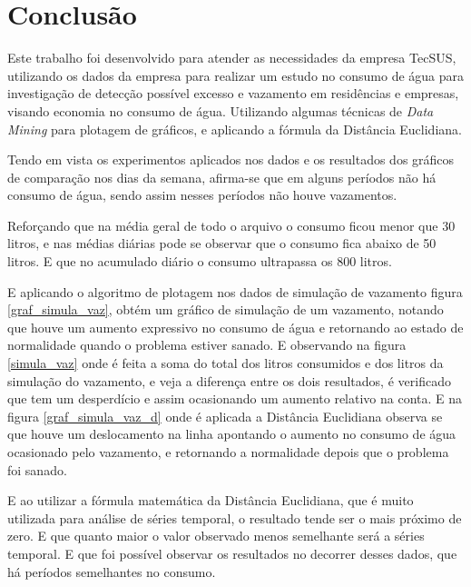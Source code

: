     \newpage
\chapter{Conclusão}
\par Este trabalho foi desenvolvido para atender as necessidades da empresa TecSUS, utilizando os dados da empresa para realizar um estudo no consumo de água para investigação de detecção possível excesso e vazamento em residências e empresas, visando economia no consumo de água. Utilizando  algumas técnicas de \emph{Data Mining} para plotagem de gráficos, e aplicando a fórmula da Distância Euclidiana. 

\par Tendo em vista  os experimentos aplicados nos dados e os resultados dos gráficos de comparação nos dias da semana, afirma-se que  em alguns períodos não há consumo de água, sendo assim nesses períodos  não houve vazamentos.
 
\par Reforçando que na média geral de todo o arquivo o consumo ficou menor que 30 litros, e nas médias diárias pode se observar que o consumo fica abaixo de 50 litros. E que no acumulado diário o consumo ultrapassa os 800 litros.

\par E aplicando o algoritmo de plotagem nos dados de simulação de vazamento figura \ref{graf_simula_vaz}, obtém um gráfico de simulação de um vazamento, notando que houve um aumento expressivo no consumo de água e retornando ao estado de normalidade quando o problema estiver sanado. E observando  na figura \ref{simula_vaz} onde é feita a soma do total dos litros consumidos e dos litros da simulação do vazamento, e veja  a diferença entre os dois resultados, é verificado que tem um desperdício e assim ocasionando um aumento relativo na conta. E na figura \ref{graf_simula_vaz_d} onde é aplicada a Distância Euclidiana observa se que houve um deslocamento na linha apontando o  aumento no consumo de água ocasionado pelo vazamento, e retornando a normalidade depois que o problema foi sanado.

\par E ao utilizar a fórmula matemática da Distância Euclidiana, que é muito utilizada para análise de séries temporal, o resultado tende ser o mais próximo de zero. E que quanto maior o valor observado menos semelhante será a séries temporal. E que foi possível observar os resultados no decorrer desses dados, que há períodos semelhantes no consumo.

